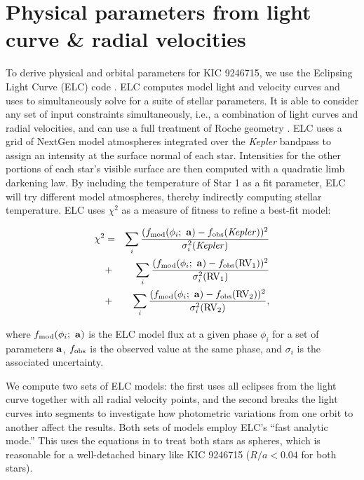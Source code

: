 \section{Physical parameters from light curve \& radial velocities}\label{model}
To derive physical and orbital parameters for KIC 9246715, we use the Eclipsing Light Curve (ELC) code \citep{oro00}. ELC computes model light and velocity curves and uses  to simultaneously solve for a suite of stellar parameters. It is able to consider any set of input constraints simultaneously, i.e., a combination of light curves and radial velocities, and can use a full treatment of Roche geometry \citep{kop69,avn75}. ELC uses a grid of NextGen model atmospheres integrated over the \emph{Kepler} bandpass to assign an intensity at the surface normal of each star. Intensities for the other portions of each star's visible surface are then computed with a quadratic limb darkening law. By including the temperature of Star 1 as a fit parameter, ELC will try different model atmospheres, thereby indirectly computing stellar temperature. ELC uses $\chi^2$ as a measure of fitness to refine a best-fit model:

\begin{eqnarray}
\chi^2 & = &
\sum_i \frac{ (f_{\rm{mod}}(\phi_i; \ {\bf a}) - f_{\rm{obs}}(\rm{\it{Kepler}}))^2 }{\sigma_i^2(\rm{\it{Kepler}})} \nonumber \\
& + & \sum_i \frac{ (f_{\rm{mod}}(\phi_i; \ {\bf a}) - f_{\rm{obs}}(\rm{RV_1}))^2 }{\sigma_i^2(\rm{RV_1})} \\
& + & \sum_i \frac{(f_{\rm{mod}}(\phi_i; \ {\bf a}) - f_{\rm{obs}}(\rm{RV_2}))^2}{\sigma_i^2(\rm{RV_2})}, \nonumber
\end{eqnarray}

\noindent where $f_{\rm{mod}}(\phi_i; \ {\bf a})$ is the ELC model flux at a given phase $\phi_i$ for a set of parameters ${\bf a}$, $f_{\rm{obs}}$ is the observed value at the same phase, and $\sigma_i$ is the associated uncertainty.

We compute two sets of ELC models: the first uses all eclipses from the light curve together with all radial velocity points, and the second breaks the light curves into segments to investigate how photometric variations from one orbit to another affect the results. Both sets of models employ ELC's ``fast analytic mode.'' This uses the equations in \citet{man02} to treat both stars as spheres, which is reasonable for a well-detached binary like KIC 9246715 ($R/a < 0.04$ for both stars). 

